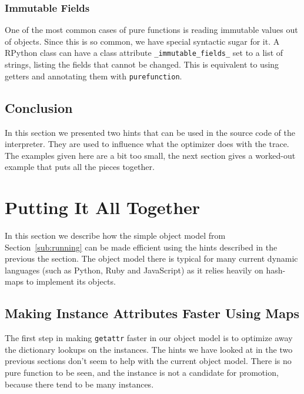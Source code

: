 \documentclass{sigplanconf}
\begin{document}
\subsubsection{Immutable Fields}

One of the most common cases of pure functions is reading immutable
values out of objects. Since this is so common, we have special syntactic sugar
for it. A RPython class can have a class attribute \texttt{\_immutable\_fields\_} set to
a list of strings, listing the fields that cannot be changed. This is equivalent
to using getters and annotating them with \texttt{purefunction}.



\subsection{Conclusion}

In this section we presented two hints that can be used in the source code
of the interpreter. They are used to influence what the optimizer does with the
trace. The examples given here are a bit too small, the next
section gives a worked-out example that puts all the pieces together.


\section{Putting It All Together}
\label{sec:fastobjmodel}

In this section we describe how the simple object model from
Section~\ref{sub:running} can be made efficient using the hints described in the
previous the section. The object model there is typical for many current
dynamic languages (such as Python, Ruby and JavaScript) as it relies heavily on
hash-maps to implement its objects.


\subsection{Making Instance Attributes Faster Using Maps}

The first step in making \texttt{getattr} faster in our object model is to optimize
away the dictionary lookups on the instances. The hints we have looked at in the
two previous sections don't seem to help with the current object model. There is
no pure function to be seen, and the instance is not a candidate for promotion,
because there tend to be many instances.
\end{document}
